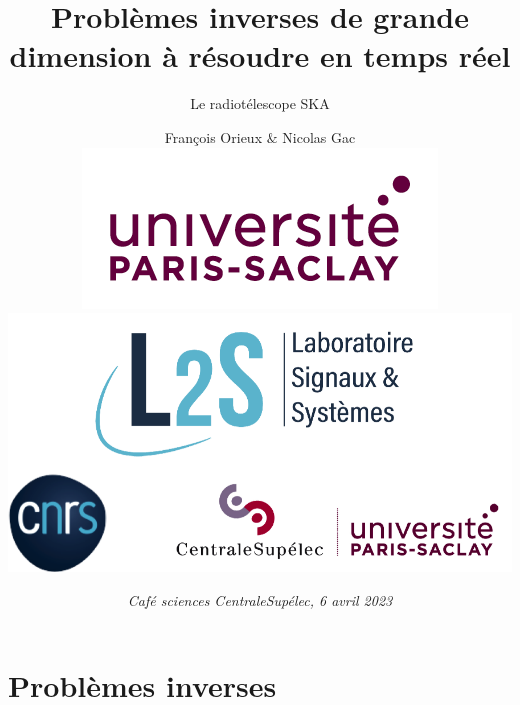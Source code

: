 \documentclass[usenames,dvipsnames]{beamer}
\title[Problème inverse SKA]{\textbf{Problèmes inverses de grande dimension à résoudre en temps réel}}
\subtitle{Le radiotélescope SKA}
\institute[L2S]{}%
\author[  F. Orieux $\&$ N. Gac]{François  Orieux $\&$ Nicolas Gac \\ \vspace{0.5cm} \includegraphics[height=1.7 cm]{logo-saclay-white.png} \hspace{2cm}
\includegraphics[height=1.7 cm]{L2S_tutelles_vertical.pdf} }
\date[Café sciences CS]{\tiny{\textit{Café sciences CentraleSupélec, 6 avril 2023}} }
\begin{document}
%


\frame[plain]{\titlepage}

\section{Problèmes inverses}
\end{document}
